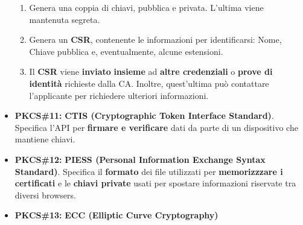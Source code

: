 \begin{itemize}
\begin{proposition}
    \begin{enumerate}
        \item Genera una coppia di chiavi, pubblica e privata. L'ultima viene mantenuta segreta.
        \item Genera un \textbf{CSR}, contenente le informazioni per identificarsi: Nome, Chiave pubblica e, eventualmente, alcune estensioni.
        \item Il \textbf{CSR} viene \textbf{inviato} \textbf{insieme} ad \textbf{altre credenziali} o \textbf{prove di identità} richieste dalla CA. Inoltre, quest'ultima può contattare l'applicante per richiedere ulteriori informazioni.
    \end{enumerate}
    \end{proposition}
    \item \textbf{PKCS\#11:} \textbf{CTIS (Cryptographic Token Interface Standard)}. Specifica l'API per \textbf{firmare e verificare} dati da parte di un dispositivo che mantiene chiavi.
    \item \textbf{PKCS\#12:} \textbf{PIESS (Personal Information Exchange Syntax Standard)}. Specifica il \textbf{formato} dei file utilizzati per \textbf{memorizzzare i certificati} e le \textbf{chiavi private} usati per spostare informazioni riservate tra diversi browsers.
    \item \textbf{PKCS\#13:} \textbf{ECC (Elliptic Curve Cryptography)}
\end{itemize}
